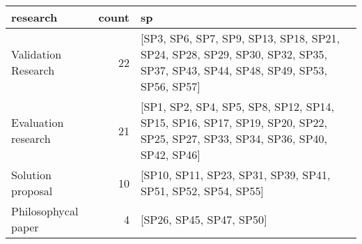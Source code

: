 \begin{tabular}{lrl}
\toprule
            research &  count &                                                                                                                          sp \\
\midrule
 Validation Research &  22 &  [SP3, SP6, SP7, SP9, SP13, SP18, SP21, SP24, SP28, SP29, SP30, SP32, SP35, SP37, SP43, SP44, SP48, SP49, SP53, SP56, SP57] \\
 Evaluation research &  21 &  [SP1, SP2, SP4, SP5, SP8, SP12, SP14, SP15, SP16, SP17, SP19, SP20, SP22, SP25, SP27, SP33, SP34, SP36, SP40, SP42, SP46] \\
 Solution proposal &  10 &  [SP10, SP11, SP23, SP31, SP39, SP41, SP51, SP52, SP54, SP55] \\
 Philosophycal paper &  4 &  [SP26, SP45, SP47, SP50] \\
\bottomrule
\end{tabular}
